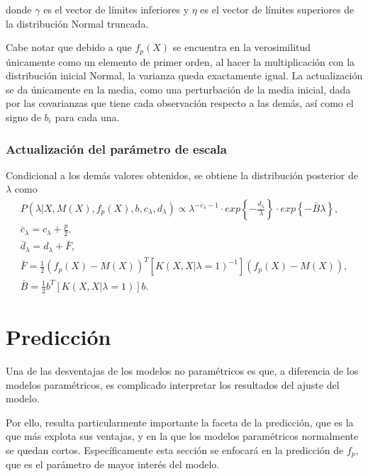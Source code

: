 donde $\gamma$ es el vector de l\'imites inferiores y $\eta$ es el vector de l\'imites superiores de la distribuci\'on Normal truncada.

Cabe notar que debido a que $f_p(X)$ se encuentra en la verosimilitud  \'unicamente como un elemento de primer orden, al hacer la multiplicaci\'on con la distribuci\'on inicial Normal, la varianza queda exactamente igual. La actualizaci\'on se da \'unicamente en la media, como una perturbaci\'on de la media inicial, dada por las covarianzas que tiene cada observaci\'on respecto a las dem\'as, as\'i como el signo de $b_i$ para cada una.

\subsubsection{Actualizaci\'on del par\'ametro de escala}

Condicional a los dem\'as valores obtenidos, se obtiene la distribuci\'on posterior  de $\lambda$ como
\begin{equation*}
\begin{gathered}
   P(\lambda|X,M(X),f_p(X),b,c_\lambda,d_\lambda) 
   \propto
   \lambda^{-\bar{c}_\lambda-1}
   \cdot
   exp\left\{- \frac{\bar{d}_\lambda}{\lambda}\right\}
   \cdot
   exp\left\{-\bar{B} \lambda\right\}, \\
   \bar{c}_\lambda = c_\lambda + \frac{p}{2}, \\
   \bar{d}_\lambda = d_\lambda + \bar{F}, \\
   \bar{F} = \frac{1}{2}(f_p(X)-M(X))^T [K(X,X|\lambda=1)^{-1}] (f_p(X)-M(X)), \\
   \bar{B} = \frac{1}{2}b^T [K(X,X|\lambda=1)] b.
\end{gathered}
\end{equation*}

\section{Predicci\'on}

Una de las desventajas de los modelos no param\'etricos es que, a diferencia de los modelos param\'etricos, es complicado interpretar los resultados del ajuste del modelo.

Por ello, resulta particularmente importante la faceta de la predicci\'on, que es la que m\'as explota sus ventajas, y en la que los modelos param\'etricos normalmente se quedan cortos. Espec\'ificamente esta secci\'on se enfocar\'a en la predicci\'on de $f_p$, que es el par\'ametro de mayor inter\'es del modelo.

